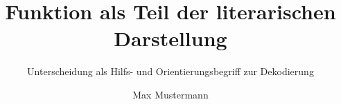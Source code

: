 \documentclass[openany,ngerman]{book}
\author{Max Mustermann}
\title{Funktion als Teil der literarischen Darstellung}
\subtitle{Unterscheidung als Hilfs- und Orientierungsbegriff zur Dekodierung}
\begin{document}
\frontmatter
\maketitle
\dedication{...\\ ...}
%

\mainmatter

\backmatter
%
\end{document}
